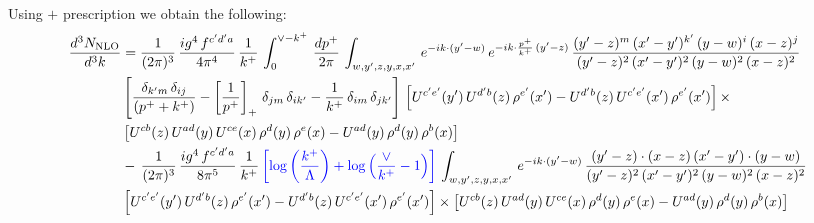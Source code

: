 \documentclass[9pt]{article}
\numberwithin{equation}{section}
\begin{document}
Using $+$ prescription we obtain the following:
\begin{align}
    \frac{d^{3}N_{\rm NLO}}{d^{3}k} & = \frac{1}{(2\pi)^{3}}\, \frac{ig^{4}\,f^{c'd'a}}{4\pi^{4}}\, \frac{1}{k^{+}}\,\int_{0}^{\vee-k^{+}}\, \frac{dp^{+}}{2\pi}\, \int_{w,y',z,y,x,x'}\, e^{-ik\cdot (y'-w)}\, e^{-ik\cdot \frac{p^{+}}{k^{+}}\,(y'-z)}\,\frac{(y'-z)^{m}\,(x'-y')^{k'}\,(y-w)^{i}\,(x-z)^{j}}{(y'-z)^{2}\,(x'-y')^{2}\,(y-w)^{2}\,(x-z)^{2}}\notag \\ & \left[\frac{\delta_{k'm}\,\delta_{ij}}{(p^{+}+k^{+})}-\left[\frac{1}{p^{+}}\right]_{+}\,\delta_{jm}\,\delta_{ik'}-\frac{1}{k^{+}}\, \delta_{im}\, \delta_{jk'}\right]\, \left[U^{c'e'}(y')\,U^{d'b}(z)\,\rho^{e'}(x')-U^{d'b}(z)\,U^{c'e'}(x')\,\rho^{e'}(x')\right]\times\notag \\ &  \left[U^{cb}(z)\,U^{ad}(y)\,U^{ce}(x)\,\rho^{d}(y)\,\rho^{e}(x)-U^{ad}(y)\,\rho^{d}(y)\,\rho^{b}(x)\right]\notag \\ &  -\,\frac{1}{(2\pi)^{3}}\, \frac{ig^{4}\,f^{c'd'a}}{8\pi^{5}}\, \frac{1}{k^{+}}\,{\color{blue}\left[\log{\left(\frac{k^{+}}{\Lambda}\right)}+\log{\left(\frac{\vee}{k^{+}}-1\right)}\right]}\, \int_{w,y',z,y,x,x'}\, e^{-ik\cdot (y'-w)}\,\frac{(y'-z)\cdot (x-z)\,(x'-y')\cdot (y-w)}{(y'-z)^{2}\,(x'-y')^{2}\,(y-w)^{2}\,(x-z)^{2}}\notag \\ & \left[U^{c'e'}(y')\,U^{d'b}(z)\,\rho^{e'}(x')-U^{d'b}(z)\,U^{c'e'}(x')\,\rho^{e'}(x')\right]\times  \left[U^{cb}(z)\,U^{ad}(y)\,U^{ce}(x)\,\rho^{d}(y)\,\rho^{e}(x)-U^{ad}(y)\,\rho^{d}(y)\,\rho^{b}(x)\right]
\end{align}
\end{document}
